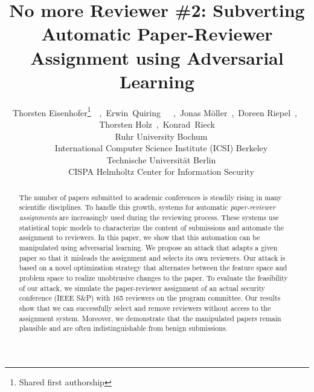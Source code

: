 \documentclass[letterpaper,twocolumn,10pt]{article}
\begin{document}
\date{}

\title{\Large \bf No more Reviewer \#2: Subverting Automatic  Paper-Reviewer \\ Assignment using Adversarial Learning}

\author{
{\rm 
    Thorsten Eisenhofer\thanks{Shared first authorship}~\footnotemark[2]~,~Erwin~Quiring\footnotemark[1]~\footnotemark[2]~\footnotemark[3]~,~Jonas Möller\footnotemark[4]~,~Doreen Riepel\footnotemark[2]~,~}
  \\
  {\rm
    Thorsten Holz\footnotemark[5]~,~Konrad~Rieck\footnotemark[4]\vspace{0.3em}
  }\\
{\normalsize \footnotemark[2]~~Ruhr University Bochum}\\
{\normalsize \footnotemark[3]~~International Computer Science Institute (ICSI) Berkeley}\\
{\normalsize \footnotemark[4]~~Technische Universität Berlin}\\
{\normalsize \footnotemark[5]~~CISPA Helmholtz Center for Information Security}\vspace{1em}\\ 
}

\maketitle

\begin{abstract}
The number of papers submitted to academic conferences is steadily rising in many scientific disciplines. To handle this growth, systems for automatic \emph{paper-reviewer assignments} are increasingly used during the reviewing process. These systems use statistical topic models to characterize the content of submissions and automate the assignment to reviewers. In this paper, we show that this automation can be manipulated using adversarial learning. We propose an attack that adapts a given paper so that it misleads the assignment and selects its own reviewers. Our attack is based on a novel optimization strategy that alternates between the feature space and problem space to realize unobtrusive changes to the paper. To evaluate the feasibility of our attack, we simulate the paper-reviewer assignment of an actual security conference (IEEE S\&P) with 165 reviewers on the program committee. Our results show that we can successfully select and remove reviewers without access to the assignment system. Moreover, we demonstrate that the manipulated papers remain plausible and are often indistinguishable from benign submissions. 
\end{abstract} \vspace{-0.5em}
\end{document}
